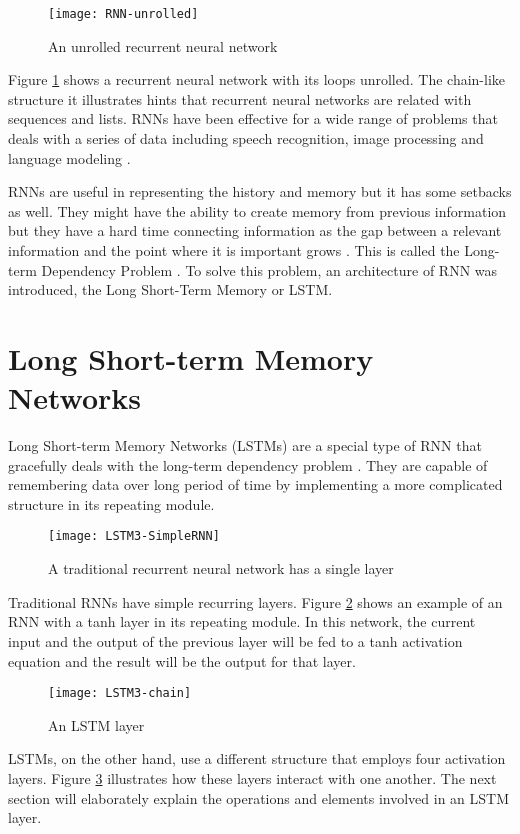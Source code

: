     \begin{figure}[H]
    \centering
    \texttt{[image: RNN-unrolled]}
    \caption{An unrolled recurrent neural network \citep{olah2015understanding}}
    \label{fig:rnn-unrolled}
    \end{figure}
    Figure \ref{fig:rnn-unrolled} shows a recurrent neural network with its loops unrolled. The chain-like structure it illustrates hints that recurrent neural networks are related with sequences and lists. RNNs have been effective for a wide range of problems that deals with a series of data including speech recognition, image processing and language modeling \citep{olah2015understanding}.

    RNNs are useful in representing the history and memory but it has some setbacks as well. They might have the ability to create memory from previous information but they have a hard time connecting information as the gap between a relevant information and the point where it is important grows \citep{graves2012supervised}. This is called the Long-term Dependency Problem \citep{bengio1994learning}. To solve this problem, an architecture of RNN was introduced, the Long Short-Term Memory or LSTM.

\section{Long Short-term Memory Networks}
    Long Short-term Memory Networks (LSTMs) are a special type of RNN that gracefully deals with the long-term dependency problem \citep{hochreiter1997long}. They are capable of remembering data over long period of time by implementing a more complicated structure in its repeating module.

    \begin{figure}[H]
    \centering
    \texttt{[image: LSTM3-SimpleRNN]}
    \caption{A traditional recurrent neural network has a single layer \citep{olah2015understanding}}
    \label{fig:rnn}
    \end{figure}
    Traditional RNNs have simple recurring layers. Figure \ref{fig:rnn} shows an example of an RNN with a tanh layer in its repeating module. In this network, the current input and the output of the previous layer will be fed to a tanh activation equation and the result will be the output for that layer.
    
    \begin{figure}[H]
    \centering
    \texttt{[image: LSTM3-chain]}
    \caption{An LSTM layer \citep{olah2015understanding}}
    \label{fig:chain}
    \end{figure}
    LSTMs, on the other hand, use a different structure that employs four activation layers. Figure \ref{fig:chain} illustrates how these layers interact with one another. The next section will elaborately explain the operations and elements involved in an LSTM layer.


